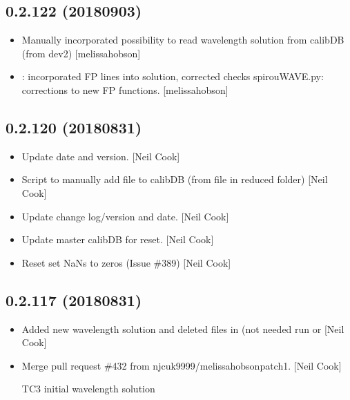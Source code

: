 \documentclass[a4paper,10pt,english]{report}
\begin{document}
\subsection{0.2.122 (2018\sphinxhyphen{}09\sphinxhyphen{}03)}
\label{\detokenize{misc/changelog:id360}}\begin{itemize}
\item {} 
Manually incorporated possibility to read wavelength solution from
calibDB (from dev2) {[}melissa\sphinxhyphen{}hobson{]}

\item {} 
: incorporated FP lines into solution,
corrected checks spirouWAVE.py: corrections to new FP functions.
{[}melissa\sphinxhyphen{}hobson{]}

\end{itemize}


\subsection{0.2.120 (2018\sphinxhyphen{}08\sphinxhyphen{}31)}
\label{\detokenize{misc/changelog:id361}}\begin{itemize}
\item {} 
Update date and version. {[}Neil Cook{]}

\item {} 
Script to manually add file to calibDB (from file in reduced folder)
{[}Neil Cook{]}

\item {} 
Update change log/version and date. {[}Neil Cook{]}

\item {} 
Update master calibDB for reset. {[}Neil Cook{]}

\item {} 
Reset  set NaNs to zeros (Issue \#389) {[}Neil Cook{]}

\end{itemize}


\subsection{0.2.117 (2018\sphinxhyphen{}08\sphinxhyphen{}31)}
\label{\detokenize{misc/changelog:id362}}\begin{itemize}
\item {} 
Added new wavelength solution and deleted files in  (not
needed \sphinxhyphen{} run  or  {[}Neil Cook{]}

\item {} 
Merge pull request \#432 from njcuk9999/melissa\sphinxhyphen{}hobson\sphinxhyphen{}patch\sphinxhyphen{}1. {[}Neil
Cook{]}

TC3 initial wavelength solution

\end{itemize}
\end{document}
